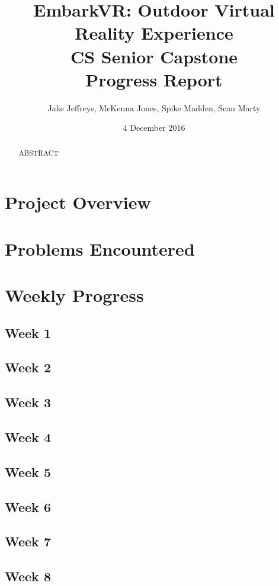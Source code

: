 \documentclass[10pt,journal,compsoc,onecolumn, draftclsnofoot]{IEEEtran}
\title{
EmbarkVR: Outdoor Virtual Reality Experience \\
CS Senior Capstone \\
Progress Report\\
\vspace{1mm}
}
\author{Jake Jeffreys, McKenna Jones, Spike Madden, Sean Marty}
\date{4 December 2016}
\begin{document}
\begin{titlepage}
\maketitle
\vspace{1mm}
\begin{abstract}
ABSTRACT
\end{abstract}
\vspace{1cm}
\end{titlepage}
\tableofcontents
\clearpage

\section{Project Overview}

\section{Problems Encountered}

\section{Weekly Progress}
\subsection{Week 1}
\subsection{Week 2}
\subsection{Week 3}
\subsection{Week 4}
\subsection{Week 5}
\subsection{Week 6}
\subsection{Week 7}
\subsection{Week 8}
\end{document}
